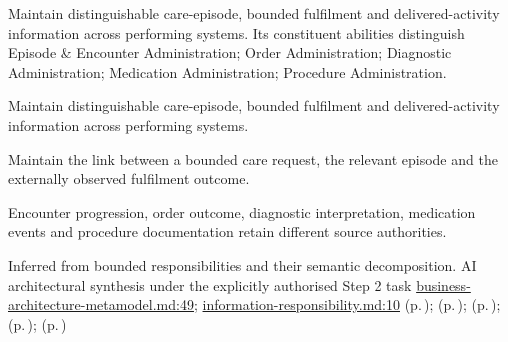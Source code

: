 Maintain distinguishable care-episode, bounded fulfilment and delivered-activity information across performing systems. Its constituent abilities distinguish Episode \& Encounter Administration; Order Administration; Diagnostic Administration; Medication Administration; Procedure Administration.



Maintain distinguishable care-episode, bounded fulfilment and delivered-activity information across performing systems.



Maintain the link between a bounded care request, the relevant episode and the externally observed fulfilment outcome.



Encounter progression, order outcome, diagnostic interpretation, medication events and procedure documentation retain different source authorities.


Inferred from bounded responsibilities and their semantic decomposition. AI architectural synthesis under the explicitly authorised Step 2 task \hyperref[evidence:4bac85accd34ce0b]{business-architecture-metamodel.md:49}; \hyperref[evidence:be61392fefb4bb10]{information-responsibility.md:10}
 (p.\,\pageref{cap:bec-episode-encounter-administration});  (p.\,\pageref{cap:bec-order-administration});  (p.\,\pageref{cap:bec-diagnostic-administration});  (p.\,\pageref{cap:bec-medication-administration});  (p.\,\pageref{cap:bec-procedure-administration})
